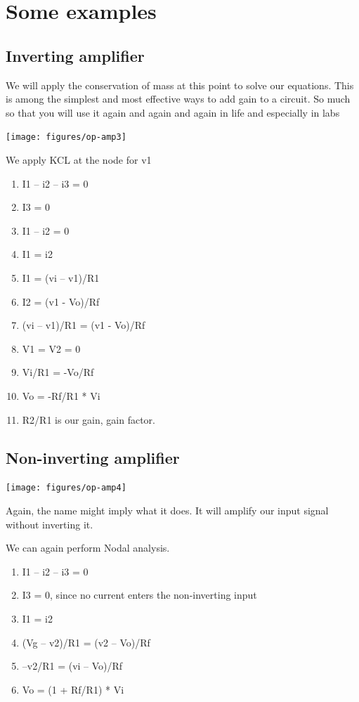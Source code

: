 \documentclass[11pt]{book}
\begin{document}
\newpage
\section{Some examples}

\subsection{Inverting amplifier}
We will apply the conservation of mass at this point to solve our equations.  This is among the simplest and most effective ways to add gain to a circuit. So much so that you will use it again and again and again in life and especially in labs

\texttt{[image: figures/op-amp3]}

We apply KCL at the node for v1
\begin{enumerate}
	\item I1 – i2 – i3 = 0
	\item I3 = 0
	\item I1 – i2 = 0
	\item I1 = i2
	\item I1 = (vi – v1)/R1
	\item I2 = (v1 - Vo)/Rf
	\item (vi – v1)/R1 = (v1 - Vo)/Rf
	\item V1 = V2 = 0
	\item Vi/R1 = -Vo/Rf
	\item Vo = -Rf/R1 * Vi
	\item R2/R1 is our gain, gain factor.
\end{enumerate}




\subsection{Non-inverting amplifier}
\texttt{[image: figures/op-amp4]}

Again, the name might imply what it does. It will amplify our input signal without inverting it.

We can again perform Nodal analysis.
\begin{enumerate}
	\item I1 – i2 – i3 = 0
	\item I3 = 0, since no current enters the non-inverting input
	\item I1 = i2
	\item (Vg – v2)/R1 = (v2 – Vo)/Rf
	\item –v2/R1 = (vi – Vo)/Rf
	\item Vo = (1 + Rf/R1) * Vi
\end{enumerate}
\end{document}
